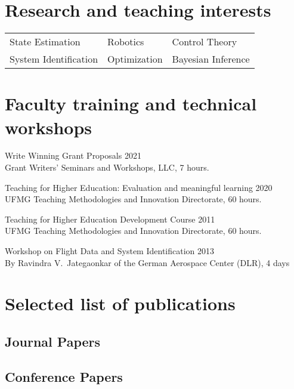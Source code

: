 \documentclass[a4paper, 11pt, oneside]{memoir}
\begin{document}
\section{Research and teaching interests}
\begin{tabular}{lll}
  State Estimation & Robotics & Control Theory
  \\
  System Identification & Optimization & Bayesian Inference
\end{tabular}

\section{Faculty training and technical workshops}
\begin{description}
\item Write Winning Grant Proposals \hfill 2021
  \\
  Grant Writers' Seminars and Workshops, LLC, 7 hours.
\item Teaching for Higher Education: Evaluation and meaningful learning
  \hfill 2020
  \\
  UFMG Teaching Methodologies and Innovation Directorate, 60 hours.
\item Teaching for Higher Education Development Course \hfill 2011
  \\
  UFMG Teaching Methodologies and Innovation Directorate, 60 hours.
\item Workshop on Flight Data and System Identification \hfill 2013
  \\
  By Ravindra V.~Jategaonkar of the German Aerospace Center (DLR), 4 days
\end{description}

\section{Selected list of publications}
\nocite{*}

\subsection{Journal Papers}
\printbibliography[
  type=article, heading=none,
]

\subsection{Conference Papers}
\printbibliography[
  type=inproceedings, heading=none,
]
\end{document}
